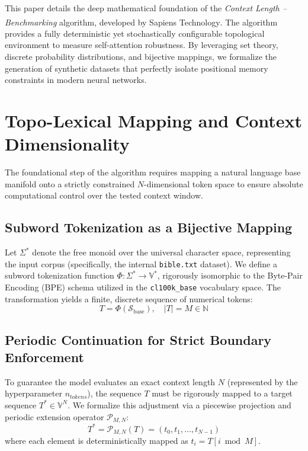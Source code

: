 \documentclass[11pt,a4paper]{article}
\newcommand{\N}{\mathbb{N}}
\newcommand{\V}{\mathbb{V}}
\begin{document}
This paper details the deep mathematical foundation of the \textit{Context Length -- Benchmarking} algorithm, developed by Sapiens Technology\textsuperscript{\tiny\textregistered}. The algorithm provides a fully deterministic yet stochastically configurable topological environment to measure self-attention robustness. By leveraging set theory, discrete probability distributions, and bijective mappings, we formalize the generation of synthetic datasets that perfectly isolate positional memory constraints in modern neural networks.

\section{Topo-Lexical Mapping and Context Dimensionality}
The foundational step of the algorithm requires mapping a natural language base manifold onto a strictly constrained $N$-dimensional token space to ensure absolute computational control over the tested context window.

\subsection{Subword Tokenization as a Bijective Mapping}
Let $\Sigma^*$ denote the free monoid over the universal character space, representing the input corpus (specifically, the internal \texttt{bible.txt} dataset). We define a subword tokenization function $\Phi: \Sigma^* \to \V^*$, rigorously isomorphic to the Byte-Pair Encoding (BPE) schema utilized in the \texttt{cl100k\_base} vocabulary space. The transformation yields a finite, discrete sequence of numerical tokens:
\begin{equation}
T = \Phi(\mathcal{S}_{\text{base}}), \quad |T| = M \in \N
\end{equation}

\subsection{Periodic Continuation for Strict Boundary Enforcement}
To guarantee the model evaluates an exact context length $N$ (represented by the hyperparameter $n_{tokens}$), the sequence $T$ must be rigorously mapped to a target sequence $T^* \in \V^N$. We formalize this adjustment via a piecewise projection and periodic extension operator $\mathcal{P}_{M, N}$:
\begin{equation}
T^* = \mathcal{P}_{M, N}(T) = (t_0, t_1, \dots, t_{N-1})
\end{equation}
where each element is deterministically mapped as $t_i = T[i \bmod M]$. 
\end{document}
